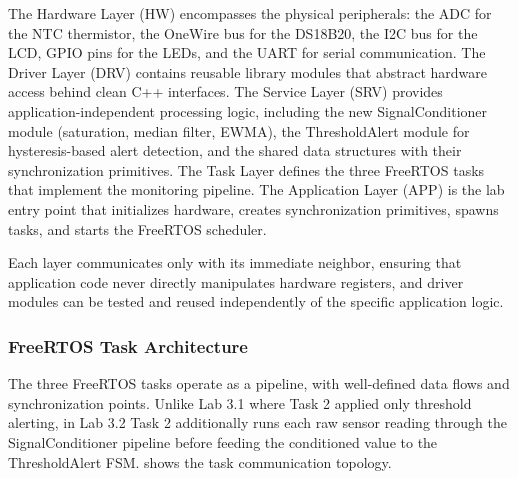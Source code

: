 The Hardware Layer (HW) encompasses the physical peripherals: the ADC for the NTC thermistor, the OneWire bus for the DS18B20, the I2C bus for the LCD, GPIO pins for the LEDs, and the UART for serial communication. The Driver Layer (DRV) contains reusable library modules that abstract hardware access behind clean C++ interfaces. The Service Layer (SRV) provides application-independent processing logic, including the new SignalConditioner module (saturation, median filter, EWMA), the ThresholdAlert module for hysteresis-based alert detection, and the shared data structures with their synchronization primitives. The Task Layer defines the three FreeRTOS tasks that implement the monitoring pipeline. The Application Layer (APP) is the lab entry point that initializes hardware, creates synchronization primitives, spawns tasks, and starts the FreeRTOS scheduler.

Each layer communicates only with its immediate neighbor, ensuring that application code never directly manipulates hardware registers, and driver modules can be tested and reused independently of the specific application logic.

\subsubsection{FreeRTOS Task Architecture}

The three FreeRTOS tasks operate as a pipeline, with well-defined data flows and synchronization points. Unlike Lab 3.1 where Task 2 applied only threshold alerting, in Lab 3.2 Task 2 additionally runs each raw sensor reading through the SignalConditioner pipeline before feeding the conditioned value to the ThresholdAlert FSM.  shows the task communication topology.

